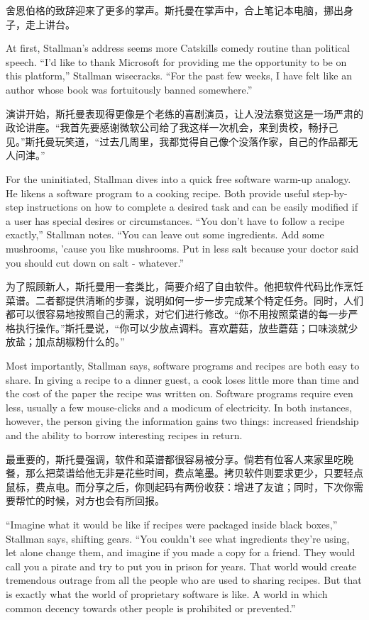 \ifdefined\chs
舍恩伯格的致辞迎来了更多的掌声。斯托曼在掌声中，合上笔记本电脑，挪出身子，走上讲台。
\fi

\ifdefined\eng
At first, Stallman's address seems more Catskills comedy routine than political speech. ``I'd like to thank Microsoft for providing me the opportunity to be on this platform,'' Stallman wisecracks. ``For the past few weeks, I have felt like an author whose book was fortuitously banned somewhere.''
\fi

\ifdefined\chs
演讲开始，斯托曼表现得更像是个老练的喜剧演员，让人没法察觉这是一场严肃的政论讲座。“我首先要感谢微软公司给了我这样一次机会，来到贵校，畅抒己见。”斯托曼玩笑道，“过去几周里，我都觉得自己像个没落作家，自己的作品都无人问津。”
\fi

\ifdefined\eng
For the uninitiated, Stallman dives into a quick free software warm-up analogy. He likens a software program to a cooking recipe. Both provide useful step-by-step instructions on how to complete a desired task and can be easily modified if a user has special desires or circumstances. ``You don't have to follow a recipe exactly,'' Stallman notes. ``You can leave out some ingredients. Add some mushrooms, 'cause you like mushrooms. Put in less salt because your doctor said you should cut down on salt - whatever.''
\fi

\ifdefined\chs
为了照顾新人，斯托曼用一套类比，简要介绍了自由软件。他把软件代码比作烹饪菜谱。二者都提供清晰的步骤，说明如何一步一步完成某个特定任务。同时，人们都可以很容易地按照自己的需求，对它们进行修改。“你不用按照菜谱的每一步严格执行操作。”斯托曼说，“你可以少放点调料。喜欢蘑菇，放些蘑菇；口味淡就少放盐；加点胡椒粉什么的。”
\fi

\ifdefined\eng
Most importantly, Stallman says, software programs and recipes are both easy to share. In giving a recipe to a dinner guest, a cook loses little more than time and the cost of the paper the recipe was written on. Software programs require even less, usually a few mouse-clicks and a modicum of electricity. In both instances, however, the person giving the information gains two things: increased friendship and the ability to borrow interesting recipes in return.
\fi

\ifdefined\chs
最重要的，斯托曼强调，软件和菜谱都很容易被分享。倘若有位客人来家里吃晚餐，那么把菜谱给他无非是花些时间，费点笔墨。拷贝软件则要求更少，只要轻点鼠标，费点电。而分享之后，你则起码有两份收获：增进了友谊；同时，下次你需要帮忙的时候，对方也会有所回报。
\fi

\ifdefined\eng
``Imagine what it would be like if recipes were packaged inside black boxes,'' Stallman says, shifting gears. ``You couldn't see what ingredients they're using, let alone change them, and imagine if you made a copy for a friend. They would call you a pirate and try to put you in prison for years. That world would create tremendous outrage from all the people who are used to sharing recipes. But that is exactly what the world of proprietary software is like. A world in which common decency towards other people is prohibited or prevented.''
\fi

